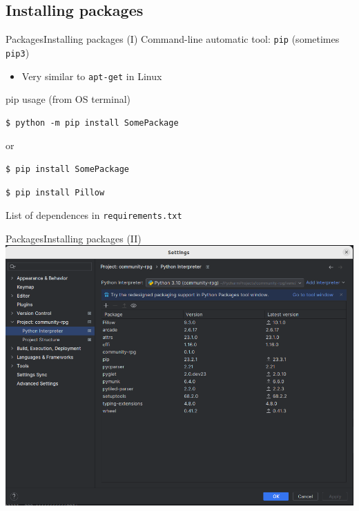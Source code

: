 \documentclass[10pt,compress]{beamer} %
\begin{document}
\subsection{Installing packages}
\begin{frame}[fragile]{Packages}{Installing packages (I)}
	Command-line automatic tool: \texttt{pip} (sometimes \texttt{pip3})
		\begin{itemize}
			\item Very similar to \texttt{apt-get} in Linux
		\end{itemize}

	\begin{block}{pip usage (from OS terminal)}
	\vspace{-0.2cm}
	\begin{verbatim}
$ python -m pip install SomePackage
\end{verbatim}
or
	\begin{verbatim}
$ pip install SomePackage
\end{verbatim}
	\vspace{-0.2cm}
\end{block}

	\begin{exampleblock}{}
	\vspace{-0.2cm}
	\begin{verbatim}
$ pip install Pillow
\end{verbatim}
	\vspace{-0.2cm}
\end{exampleblock}
    List of dependences in \texttt{requirements.txt}
\end{frame}

\begin{frame}[fragile]{Packages}{Installing packages (II)}
	    \includegraphics[width=0.8\linewidth]{figs/packages}
\end{frame}
\end{document}
